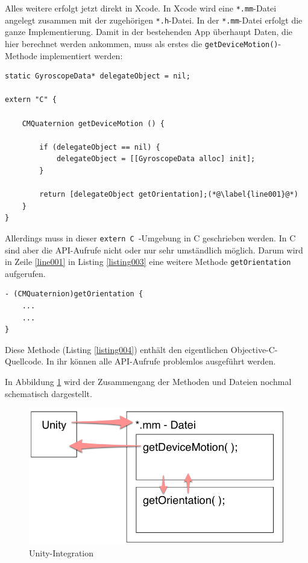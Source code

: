 Alles weitere erfolgt jetzt direkt in Xcode. In Xcode wird eine \texttt{*.mm}-Datei angelegt zusammen mit der zugehörigen \texttt{*.h}-Datei. In der \texttt{*.mm}-Datei erfolgt die ganze Implementierung. Damit in der bestehenden App überhaupt Daten, die hier berechnet werden ankommen, muss als erstes die \texttt{getDeviceMotion()}-Methode implementiert werden:
~\\
\begin{lstlisting}[float=htb, caption=Methode \texttt{getDeviceMotion}, label=listing003]
static GyroscopeData* delegateObject = nil;

extern "C" {

	CMQuaternion getDeviceMotion () {

		if (delegateObject == nil) {
			delegateObject = [[GyroscopeData alloc] init];
		}
		
		return [delegateObject getOrientation];(*@\label{line001}@*)
	}    
}
\end{lstlisting}

Allerdings muss in dieser \texttt{extern  C }-Umgebung in C geschrieben werden. In C sind aber die API-Aufrufe nicht oder nur sehr umständlich möglich. Darum wird in Zeile \ref{line001} in Listing \ref{listing003} eine weitere Methode \texttt{getOrientation} aufgerufen. 
~\\
\begin{lstlisting}[float=htb, caption=Methode \texttt{getOrientation}, label=listing004]
- (CMQuaternion)getOrientation {
	...
	...
}
\end{lstlisting}

Diese Methode (Listing \ref{listing004})  enthält den eigentlichen Objective-C-Quellcode. In ihr können alle API-Aufrufe problemlos ausgeführt werden. 

In Abbildung \ref{fig:unity-integration} wird der Zusammengang der Methoden und Dateien nochmal schematisch dargestellt.

\cite{unity}

\begin{figure}[htb]
\centering
\includegraphics[scale=0.5]{figures/unity-integration}
\caption{Unity-Integration}
\label{fig:unity-integration}
\end{figure}
  
